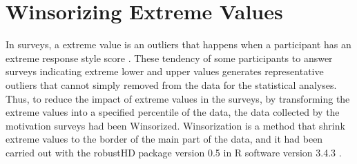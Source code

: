 

\section{Winsorizing Extreme Values}
\label{subsec:winsorizing-motivation-survey}

In surveys, a extreme value is an outliers that happens when a participant has an extreme response style score \cite{Lavrakas2008}. These tendency of some participants to answer surveys indicating extreme lower and upper values generates representative outliers that cannot simply removed from the data for the statistical analyses. Thus, to reduce the impact of extreme values in the surveys, by transforming the extreme values into a specified percentile of the data, the data collected by the motivation surveys had been Winsorized. Winsorization is a method that shrink extreme values to the border of the main part of the data, and it had been carried out with the robustHD package version 0.5 \cite{Alfons2016} in R software version 3.4.3 \cite{RCoreTeam2017}.

